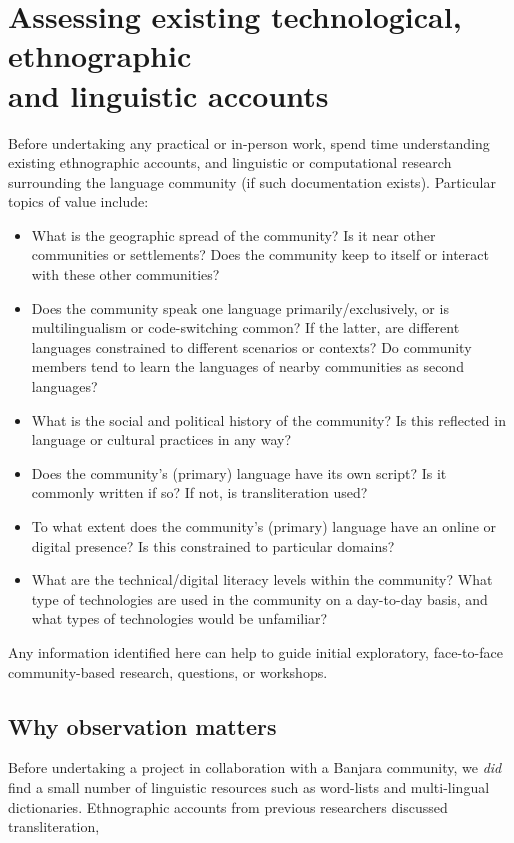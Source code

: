 \documentclass[10pt,twoside,openright]{report}
\begin{document}
\section{Assessing existing technological, ethnographic\texorpdfstring{\\}{ }and linguistic accounts}

Before undertaking any practical or in-person work, spend time understanding existing ethnographic accounts, and linguistic or computational research surrounding the language community (if such documentation exists).
Particular topics of value include:
\begin{itemize}
    \item What is the geographic spread of the community?
    Is it near other communities or settlements?
    Does the community keep to itself or interact with these other communities?  
    \item Does the community speak one language primarily/exclusively, or is multilingualism or code-switching common?
    If the latter, are different languages constrained to different scenarios or contexts?
    Do community members tend to learn the languages of nearby communities as second languages? 
    \item What is the social and political history of the community?
    Is this reflected in language or cultural practices in any way?
    \item Does the community's (primary) language have its own script?
    Is it commonly written if so?
    If not, is transliteration used?
    \item To what extent does the community's (primary) language have an online or digital presence?
    Is this constrained to particular domains? 
    \item What are the technical/digital literacy levels within the community?
    What type of technologies are used in the community on a day-to-day basis, and what types of technologies would be unfamiliar? 
\end{itemize} 

Any information identified here can help to guide initial exploratory, face-to-face community-based research, questions, or workshops. 

\begin{unmutehighlight}
\section*{Why observation matters}
Before undertaking a project in collaboration with a Banjara community, we \textit{did} find a small number of linguistic resources such as word-lists and multi-lingual dictionaries.
Ethnographic accounts from previous researchers discussed transliteration,
\end{unmutehighlight}
\end{document}
